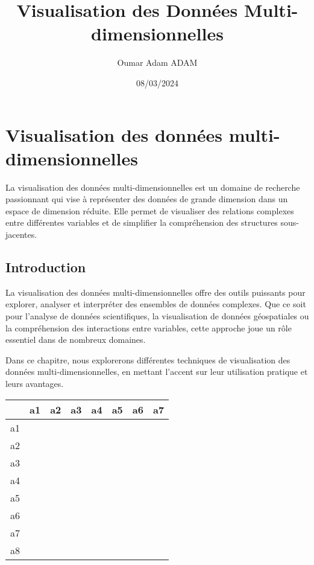 \documentclass{article}
\title{Visualisation des Données Multi-dimensionnelles}
\author{Oumar Adam ADAM}
\date{08/03/2024}
\begin{document}
\maketitle

\section{Visualisation des données multi-dimensionnelles}
\label{sec:visualisation_des_donnees_multi_dimensionnelles}

La visualisation des données multi-dimensionnelles est un domaine de recherche passionnant qui vise à représenter des données de grande dimension dans un espace de dimension réduite. Elle permet de visualiser des relations complexes entre différentes variables et de simplifier la compréhension des structures sous-jacentes.

\subsection{Introduction}
\label{subsec:introduction}

La visualisation des données multi-dimensionnelles offre des outils puissants pour explorer, analyser et interpréter des ensembles de données complexes. Que ce soit pour l'analyse de données scientifiques, la visualisation de données géospatiales ou la compréhension des interactions entre variables, cette approche joue un rôle essentiel dans de nombreux domaines.

Dans ce chapitre, nous explorerons différentes techniques de visualisation des données multi-dimensionnelles, en mettant l'accent sur leur utilisation pratique et leurs avantages.




\begin{tabular}{|c|c|c|c|c|c|c|c|}
\hline
    & a1 & a2 & a3 & a4 & a5 & a6 & a7 \\
\hline
a1 &&&&&&& \\
\hline
a2 &&&&&&& \\
\hline
a3 &&&&&&& \\
\hline
a4 &&&&&&& \\
\hline
a5&&&&&&& \\
\hline
a6 &&&&&&& \\
\hline
a7 &&&&&&& \\
\hline
a8 &&&&&&& \\
\hline
\end{tabular}
        

\end{document}
